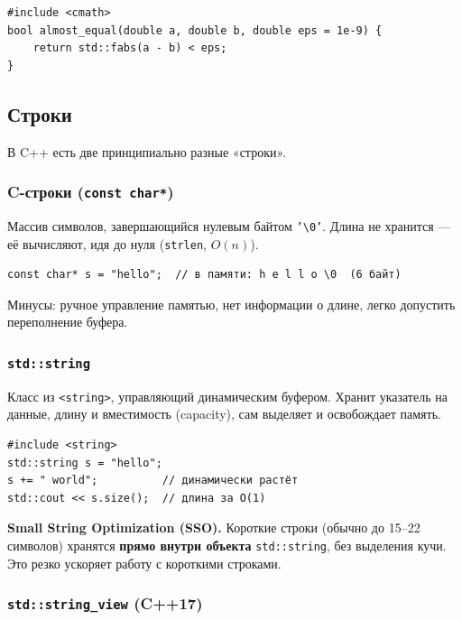 \begin{lstlisting}
#include <cmath>
bool almost_equal(double a, double b, double eps = 1e-9) {
    return std::fabs(a - b) < eps;
}
\end{lstlisting}

\subsection{Строки}

В C++ есть две принципиально разные «строки».

\subsubsection{C-строки (\texttt{const char*})}

Массив символов, завершающийся нулевым байтом \texttt{'\textbackslash 0'}.
Длина не хранится --- её вычисляют, идя до нуля (\texttt{strlen}, $O(n)$).

\begin{lstlisting}
const char* s = "hello";  // в памяти: h e l l o \0  (6 байт)
\end{lstlisting}

Минусы: ручное управление памятью, нет информации о длине, легко допустить
переполнение буфера.

\subsubsection{\texttt{std::string}}

Класс из \texttt{<string>}, управляющий динамическим буфером. Хранит указатель на
данные, длину и вместимость (capacity), сам выделяет и освобождает память.

\begin{lstlisting}
#include <string>
std::string s = "hello";
s += " world";          // динамически растёт
std::cout << s.size();  // длина за O(1)
\end{lstlisting}

\textbf{Small String Optimization (SSO).} Короткие строки (обычно до 15--22
символов) хранятся \textbf{прямо внутри объекта} \texttt{std::string}, без
выделения кучи. Это резко ускоряет работу с короткими строками.

\subsubsection{\texttt{std::string\_view} (C++17)}

